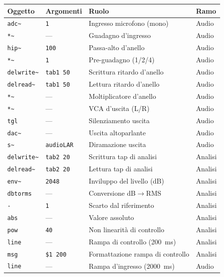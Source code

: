 \documentclass[11pt,a4paper]{article}
\begin{document}
\begin{table}[htbp]
\centering
\small
\begin{tabular}{@{}llll@{}}
\toprule
Oggetto & Argomenti & Ruolo & Ramo \\
\midrule
\texttt{adc\textasciitilde{}} & \texttt{1} & Ingresso microfono (mono) & Audio \\
\texttt{*\textasciitilde{}} & --- & Guadagno d'ingresso & Audio \\
\texttt{hip\textasciitilde{}} & \texttt{100} & Passa-alto d'anello & Audio \\
\texttt{*\textasciitilde{}} & \texttt{1} & Pre-guadagno (1/2/4) & Audio \\
\texttt{delwrite\textasciitilde{}} & \texttt{tab1 50} & Scrittura ritardo d'anello & Audio \\
\texttt{delread\textasciitilde{}} & \texttt{tab1 50} & Lettura ritardo d'anello & Audio \\
\texttt{*\textasciitilde{}} & --- & Moltiplicatore d'anello & Audio \\
\texttt{*\textasciitilde{}} & --- & VCA d'uscita (L/R) & Audio \\
\texttt{tgl} & --- & Silenziamento uscita & Audio \\
\texttt{dac\textasciitilde{}} & --- & Uscita altoparlante & Audio \\
\texttt{s\textasciitilde{}} & \texttt{audioLAR} & Diramazione uscita & Audio \\
\texttt{delwrite\textasciitilde{}} & \texttt{tab2 20} & Scrittura tap di analisi & Analisi \\
\texttt{delread\textasciitilde{}} & \texttt{tab2 20} & Lettura tap di analisi & Analisi \\
\texttt{env\textasciitilde{}} & \texttt{2048} & Inviluppo del livello (dB) & Analisi \\
\texttt{dbtorms} & --- & Conversione dB$\to$RMS & Analisi \\
\texttt{-} & \texttt{1} & Scarto dal riferimento & Analisi \\
\texttt{abs} & --- & Valore assoluto & Analisi \\
\texttt{pow} & \texttt{40} & Non linearità di controllo & Analisi \\
\texttt{line} & --- & Rampa di controllo (\SI{200}{\milli\second}) & Analisi \\
\texttt{msg} & \texttt{\$1 200} & Formattazione rampa di controllo & Analisi \\
\texttt{line} & --- & Rampa d'ingresso (\SI{2000}{\milli\second}) & Audio \\

\end{tabular}
\end{table}
\end{document}
